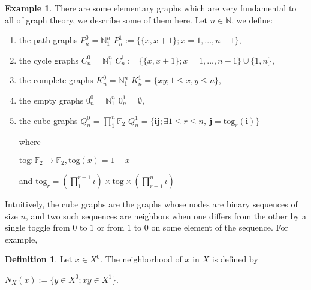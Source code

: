 \documentclass[]{article}
\theoremstyle{definition}
\newtheorem{definition}{Definition}[section]
\theoremstyle{definition}
\newtheorem{exmp}{Example}[section]
\newcommand{\raw}{\rightarrow}
\newcommand{\bb}{\mathbb}
\begin{document}
\begin{exmp}
	There are some elementary graphs which are very fundamental to all of graph theory, we describe some of them here. Let $n \in \bb{N}$, we define:
	
	\begin{enumerate}
		\item  the path graphs
		\subitem $P_n^0 = \bb{N}^n_1$
		\subitem $P_n^1 := \{\{x,x+1\}; x = 1, ..., n-1\}$,
		
		\item the cycle graphs
		\subitem $C_n^0 = \bb{N}^n_1$
		\subitem $C_n^1 := \{\{x,x+1\}; x = 1, ..., n-1\} \cup \{1, n\}$,
		
		\item the complete graphs
		\subitem $K_n^0 = \bb{N}^n_1$
		\subitem $K_n^1 = \{xy; 1 \leq x,y \leq n \}$,
				
		\item the empty graphs
		\subitem $0_n^0 = \bb{N}^n_1$
		\subitem $0_n^1 = \emptyset$,
				
		\item the cube graphs
		\subitem $Q_n^0 = \prod_{1}^{n} \bb{F}_2$
		\subitem $Q_n^1 = \{\textbf{i}\textbf{j}; \exists 1\leq r\leq n, \ \textbf{j}=\text{tog}_r(\textbf{i})\}$
		
		\noindent where 
		
		\begin{center}
			$\text{tog}:\bb{F}_2 \raw \bb{F}_2, \text{tog}(x) = 1-x$ 
			
			and $\text{tog}_r = (\prod_1^{r-1}\iota) \times \text{tog} \times (\prod_{r+1}^n \iota)$
		\end{center}
		
	\end{enumerate}
	
\end{exmp}

Intuitively, the cube graphs are the graphs whose nodes are binary sequences of size $n$, and two such sequences are neighbors when one differs from the other by a single toggle from $0$ to $1$ or from $1$ to $0$ on some element of the sequence. For example, 

\begin{definition}
	Let $x \in X^0$. The neighborhood of $x$ in $X$ is defined by 
	
	\begin{center}
		$N_X(x) := \{y \in X^0; xy \in X^1 \}$.
	\end{center}
\end{definition}
\end{document}
